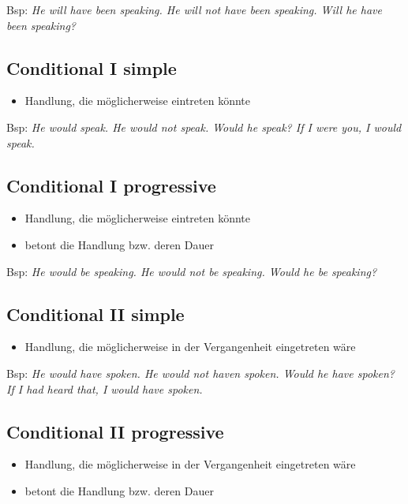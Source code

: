 Bsp: \textit{He will have been speaking. He will not have been speaking. Will he have been speaking?}

\subsection{Conditional I simple}
\begin{itemize}\itemsep0em
	\item Handlung, die möglicherweise eintreten könnte
\end{itemize}

Bsp: \textit{He would speak. He would not speak. Would he speak? If I were you, I would speak.}

\subsection{Conditional I progressive}
\begin{itemize}\itemsep0em
	\item Handlung, die möglicherweise eintreten könnte
	\item betont die Handlung bzw. deren Dauer
\end{itemize}

Bsp: \textit{He would be speaking. He would not be speaking. Would he be speaking?}

\subsection{Conditional II simple}
\begin{itemize}\itemsep0em
	\item Handlung, die möglicherweise in der Vergangenheit eingetreten wäre
\end{itemize}

Bsp: \textit{He would have spoken. He would not haven spoken. Would he have spoken? If I had heard that, I would have spoken.}

\subsection{Conditional II progressive}
\begin{itemize}\itemsep0em
	\item Handlung, die möglicherweise in der Vergangenheit eingetreten wäre
	\item betont die Handlung bzw. deren Dauer
\end{itemize}

